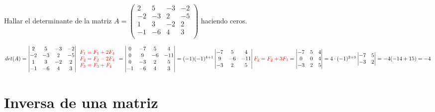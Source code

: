 \begin{ejemplo}
Hallar el determinante de la matriz $A=\begin{pmatrix} 
 2& 5& -3& -2 \\
 -2& -3& 2& -5 \\
 1& 3& -2& 2 \\
 -1& -6& 4& 3 \\
\end{pmatrix} $
haciendo ceros.

\tcblower
$det(A)=\begin{vmatrix} 
2 & 5 & -3 & -2 \\
-2 & -3 & 2 & -5 \\
1 & 3 & -2 & 2 \\
-1 & -6 & 4 & 3 \\ \end{vmatrix} 
{\color{red}\begin{array}{l} F_1  = F_1+2F_4 \\ F_2=F_2-2F_4 \\ F_3=F_3+F_4 \end{array}} =  \begin{vmatrix} 
0 & -7 & 5 & 4 \\
0 & 9 & -6 & -11 \\
0 & -3 & 2 & 5 \\
-1 & -6 & 4 & 3 \\ 
\end{vmatrix}  = 
(-1)(-1)^{4+1}\begin{vmatrix} 
-7 & 5 & 4 \\
9 & -6 & -11 \\
-3 & 2 & 5 \\ 
\end{vmatrix}  {\color{red}F_2=F_2+3F_3}  = 
\begin{vmatrix} 
-7 & 5 & 4 \\
0 & 0 & 4 \\
-3 & 2 & 5 \\ 
\end{vmatrix} = 4\cdot (-1)^{2+3} \begin{vmatrix} 
-7 & 5  \\
-3 & 2  \\ 
\end{vmatrix} = -4(-14+15)=-4
$
\end{ejemplo}




\section{Inversa de una matriz}

